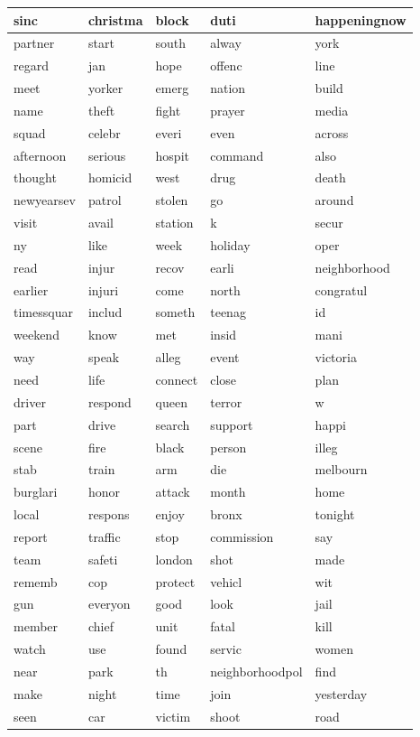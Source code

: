 \begin{longtable}{p{2.5cm}p{2.5cm}p{2.5cm}p{2.5cm}p{2.5cm}}
sinc&christma&block&duti&happeningnow\\ \hline 
partner&start&south&alway&york\\ \hline 
regard&jan&hope&offenc&line\\ \hline 
meet&yorker&emerg&nation&build\\ \hline 
name&theft&fight&prayer&media\\ \hline 
squad&celebr&everi&even&across\\ \hline 
afternoon&serious&hospit&command&also\\ \hline 
thought&homicid&west&drug&death\\ \hline 
newyearsev&patrol&stolen&go&around\\ \hline 
visit&avail&station&k&secur\\ \hline 
ny&like&week&holiday&oper\\ \hline 
read&injur&recov&earli&neighborhood\\ \hline 
earlier&injuri&come&north&congratul\\ \hline 
timessquar&includ&someth&teenag&id\\ \hline 
weekend&know&met&insid&mani\\ \hline 
way&speak&alleg&event&victoria\\ \hline 
need&life&connect&close&plan\\ \hline 
driver&respond&queen&terror&w\\ \hline 
part&drive&search&support&happi\\ \hline 
scene&fire&black&person&illeg\\ \hline 
stab&train&arm&die&melbourn\\ \hline 
burglari&honor&attack&month&home\\ \hline 
local&respons&enjoy&bronx&tonight\\ \hline 
report&traffic&stop&commission&say\\ \hline 
team&safeti&london&shot&made\\ \hline 
rememb&cop&protect&vehicl&wit\\ \hline 
gun&everyon&good&look&jail\\ \hline 
member&chief&unit&fatal&kill\\ \hline 
watch&use&found&servic&women\\ \hline 
near&park&th&neighborhoodpol&find\\ \hline 
make&night&time&join&yesterday\\ \hline 
seen&car&victim&shoot&road\\ \hline 

\end{longtable}
